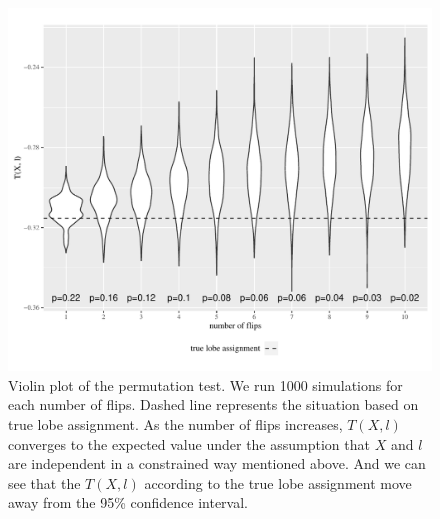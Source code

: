 \begin{figure}
\centering
\includegraphics[width=1\textwidth]{./Figures/violinplot_new_flip_2norm_1_8.pdf}
\caption[Violin plot of the permutation test]{Violin plot of the permutation test.
We run 1000 simulations for each number of flips. Dashed line represents the situation based on true lobe assignment. As the number of flips increases, $T(X, l)$ converges to the expected value under the assumption that $X$ and $l$ are independent in a constrained way mentioned above. And we can see that the $T(X, l)$ according to the true lobe assignment move away from the 95\% confidence interval.}
\label{fig:violin_plot}
\end{figure}






